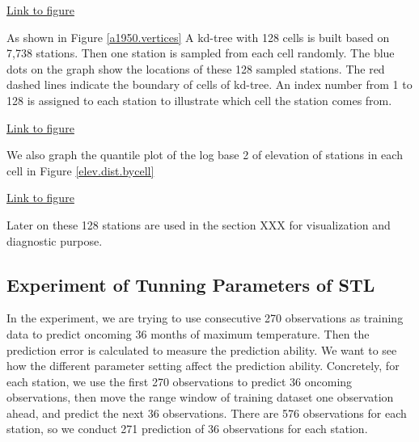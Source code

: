 \begin{framed}
\begin{center}
  \href{../plots/a1950stations.pdf}{Link to figure}
  \label{a1950.location}
\end{center}
\end{framed}

As shown in Figure \href{../plots/vertices.a1950.pdf}{\ref*{a1950.vertices}}
A kd-tree with 128 cells is built based on 7,738 stations. Then one station is 
sampled from each cell randomly. The blue dots on the graph show the locations 
of these 128 sampled stations. The red dashed lines indicate the boundary of cells 
of kd-tree. An index number from 1 to 128 is assigned to each station to 
illustrate which cell the station comes from. 

\begin{framed}
\begin{center}
  \href{../plots/vertices.a1950.pdf}{Link to figure}
  \label{a1950.vertices}
\end{center}
\end{framed}

We also graph the quantile plot of the log base 2 of elevation of stations in each
cell in Figure \href{../plots/elev.dist.bycell.pdf}{\ref*{elev.dist.bycell}}

\begin{framed}
\begin{center}
  \href{../plots/elev.dist.bycell.pdf}{Link to figure}
  \label{elev.dist.bycell}
\end{center}
\end{framed}

Later on these 128 stations are used in the section XXX for visualization and 
diagnostic purpose.

\subsection{Experiment of Tunning Parameters of STL}

In the experiment, we are trying to use consecutive 270 observations as training 
data to predict oncoming 36 months of maximum temperature. Then the prediction 
error is calculated to measure the prediction ability. 
We want to see how the different parameter setting affect 
the prediction ability. Concretely, for each station, we use the first 270 
observations to predict 36 oncoming observations, then move the range window of 
training dataset one observation ahead, and predict the next 36 observations. 
There are 576 observations for each station, so we conduct 271 prediction of 36
observations for each station.

